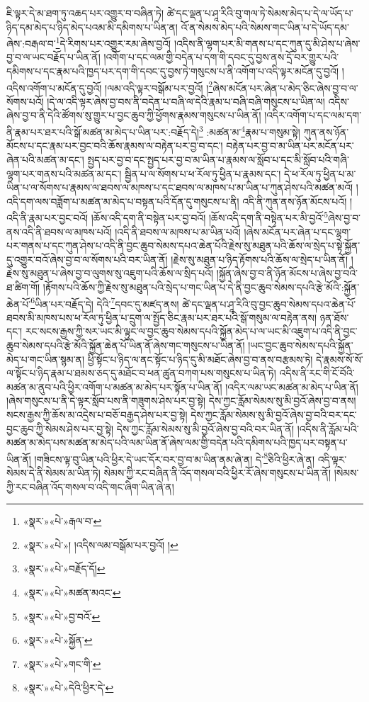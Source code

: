 ཇི་ལྟར་དེ་མ་ཐག་ཏུ་འཆད་པར་འགྱུར་བ་བཞིན་ཏེ། ཚེ་དང་ལྡན་པ་ཤཱ་རིའི་བུ་གལ་ཏེ་སེམས་མེད་པ་དེ་ལ་ཡོད་པ་ཉིད་དམ་མེད་པ་ཉིད་མེད་པའམ་མི་དམིགས་པ་ཡིན་ན། འོ་ན་སེམས་མེད་པའི་སེམས་གང་ཡིན་པ་དེ་ཡོད་དམ་ཞེས་:བརྒལ་བ་\footnote{«སྣར་»«པེ་»རྒལ་བ་}དེ་རིགས་པར་འགྱུར་རམ་ཞེས་བྱའོ། །འདིས་ནི་ལྷག་པར་མི་གནས་པ་དང་ཀུན་དུ་མི་ཤེས་པ་ཞེས་བྱ་བ་ལ་ཡང་བརྗོད་པ་ཡིན་ནོ། །འགོག་པ་དང་ལམ་གྱི་བདེན་པ་དག་གི་དབང་དུ་བྱས་ནས་དྲོ་བར་གྱུར་པའི་དམིགས་པ་དང་རྣམ་པའི་ཁྱད་པར་དག་གི་དབང་དུ་བྱས་ཏེ་གསུངས་པ་ནི་འགོག་པ་འདི་ལྟར་མངོན་དུ་བྱའོ། །འདིས་འགོག་པ་མངོན་དུ་བྱའོ། །ལམ་འདི་ལྟར་བསྒོམ་པར་བྱའོ། །\footnote{«སྣར་»«པེ་»། །འདིས་ལམ་བསྒོམ་པར་བྱའོ། །}ཞེས་མངོན་པར་ཞེན་པ་མེད་ཅིང་ཞེས་བྱ་བ་ལ་སོགས་པའོ། །དེ་ལ་འདི་ལྟར་ཞེས་བྱ་བས་ནི་བདེན་པ་བཞི་ལ་དེའི་རྣམ་པ་བཞི་བཞི་གསུངས་པ་ཡིན་ལ། འདིས་ཞེས་བྱ་བ་ནི་དེའི་ཚོགས་སུ་གྱུར་པ་བྱང་ཆུབ་ཀྱི་ཕྱོགས་རྣམས་གསུངས་པ་ཡིན་ནོ། །འདིར་འགོག་པ་དང་ལམ་དག་ནི་རྣམ་པར་ཐར་པའི་སྒོ་མཚན་མ་མེད་པ་ཡིན་པར་:བརྗོད་དེ།\footnote{«སྣར་»«པེ་»བརྗོད་དོ།} :མཚན་མ་\footnote{«སྣར་»«པེ་»མཚན་མའང་}རྣམ་པ་གསུམ་སྟེ། ཀུན་ནས་ཉོན་མོངས་པ་དང་རྣམ་པར་བྱང་བའི་ཆོས་རྣམས་ལ་བརྟེན་པར་བྱ་བ་དང་། བརྟེན་པར་བྱ་བ་མ་ཡིན་པར་མངོན་པར་ཞེན་པའི་མཚན་མ་དང་། སྤྱད་པར་བྱ་བ་དང་སྤྱད་པར་བྱ་བ་མ་ཡིན་པ་རྣམས་ལ་སློབ་པ་དང་མི་སློབ་པའི་གཞི་ལྷག་པར་གནས་པའི་མཚན་མ་དང་། སྦྱིན་པ་ལ་སོགས་པ་ཕ་རོལ་ཏུ་ཕྱིན་པ་རྣམས་དང་། དེ་ཕ་རོལ་ཏུ་ཕྱིན་པ་མ་ཡིན་པ་ལ་སོགས་པ་རྣམས་ལ་ཐབས་ལ་མཁས་པ་དང་ཐབས་ལ་མཁས་པ་མ་ཡིན་པ་ཀུན་ཤེས་པའི་མཚན་མའོ། །འདི་དག་ལས་བཟློག་པ་མཚན་མ་མེད་པ་བསྟན་པའི་དོན་དུ་གསུངས་པ་ནི། འདི་ནི་ཀུན་ནས་ཉོན་མོངས་པའོ། །འདི་ནི་རྣམ་པར་བྱང་བའོ། །ཆོས་འདི་དག་ནི་བསྟེན་པར་བྱ་བའོ། །ཆོས་འདི་དག་ནི་བསྟེན་པར་མི་བྱའོ་\footnote{«སྣར་»«པེ་»བྱ་བའོ་}ཞེས་བྱ་བ་ནས་འདི་ནི་ཐབས་ལ་མཁས་པའོ། །འདི་ནི་ཐབས་ལ་མཁས་པ་མ་ཡིན་པའོ། །ཞེས་མངོན་པར་ཞེན་པ་དང་ལྷག་པར་གནས་པ་དང་ཀུན་ཤེས་པ་འདི་ནི་བྱང་ཆུབ་སེམས་དཔའ་ཆེན་པོའི་རྗེས་སུ་མཐུན་པའི་ཆོས་ལ་སྲེད་པ་སྟེ་སྐྱོན་དུ་འགྱུར་བའོ་ཞེས་བྱ་བ་ལ་སོགས་པའི་བར་ཡིན་ནོ། །རྗེས་སུ་མཐུན་པ་ཉིད་རྟོགས་པའི་ཆོས་ལ་སྲེད་པ་ཡིན་ནོ། །རྗེས་སུ་མཐུན་པ་ཞེས་བྱ་བ་ལུགས་སུ་འཇུག་པའི་ཆོས་ལ་སྲིད་པའོ། །སྐྱོན་ཞེས་བྱ་བ་ནི་ཉོན་མོངས་པ་ཞེས་བྱ་བའི་ཐ་ཚིག་གོ། །རྟོགས་པའི་ཆོས་ཀྱི་རྗེས་སུ་མཐུན་པའི་སྲེད་པ་གང་ཡིན་པ་དེ་ནི་བྱང་ཆུབ་སེམས་དཔའི་རྩེ་མོའི་:སྐྱོན་ཆེན་པོ་\footnote{«སྣར་»«པེ་»སྐྱོན་}ཡིན་པར་བརྗོད་དེ། དེའི་\footnote{«སྣར་»«པེ་»གང་གི་}དབང་དུ་མཛད་ནས། ཚེ་དང་ལྡན་པ་ཤཱ་རིའི་བུ་བྱང་ཆུབ་སེམས་དཔའ་ཆེན་པོ་ཐབས་མི་མཁས་པས་ཕ་རོལ་ཏུ་ཕྱིན་པ་དྲུག་ལ་སྤྱོད་ཅིང་རྣམ་པར་ཐར་པའི་སྒོ་གསུམ་ལ་བརྟེན་ནས། ཉན་ཐོས་དང་། རང་སངས་རྒྱས་ཀྱི་སར་ཡང་མི་ལྟུང་ལ་བྱང་ཆུབ་སེམས་དཔའི་སྐྱོན་མེད་པ་ལ་ཡང་མི་འཇུག་པ་འདི་ནི་བྱང་ཆུབ་སེམས་དཔའི་རྩེ་མོའི་སྐྱོན་ཆེན་པོ་ཡིན་ནོ་ཞེས་གང་གསུངས་པ་ཡིན་ནོ། །ཡང་བྱང་ཆུབ་སེམས་དཔའི་སྐྱོན་མེད་པ་གང་ཡིན་སྙམ་ན། ཕྱི་སྟོང་པ་ཉིད་ལ་ནང་སྟོང་པ་ཉིད་དུ་མི་མཐོང་ཞེས་བྱ་བ་ནས་བརྩམས་ཏེ། དེ་རྣམས་སོ་སོ་ལ་སྟོང་པ་ཉིད་རྣམ་པ་ཐམས་ཅད་དུ་མཐོང་བ་ཕན་ཚུན་བཀག་པས་གསུངས་པ་ཡིན་ཏེ། འདིས་ནི་རང་གི་ངོ་བོའི་མཚན་མ་ནུབ་པའི་ཕྱིར་འགོག་པ་མཚན་མ་མེད་པར་སྟོན་པ་ཡིན་ནོ། །འདིར་ལམ་ཡང་མཚན་མ་མེད་པ་ཡིན་ནོ། །ཞེས་གསུངས་པ་ནི་དེ་ལྟར་སློབ་པས་ནི་གཟུགས་ཤེས་པར་བྱ་སྟེ། དེས་ཀྱང་རློམ་སེམས་སུ་མི་བྱའོ་ཞེས་བྱ་བ་ནས། སངས་རྒྱས་ཀྱི་ཆོས་མ་འདྲེས་པ་བཅོ་བརྒྱད་ཤེས་པར་བྱ་སྟེ། དེས་ཀྱང་རློམ་སེམས་སུ་མི་བྱའོ་ཞེས་བྱ་བའི་བར་དང་བྱང་ཆུབ་ཀྱི་སེམས་ཤེས་པར་བྱ་སྟེ། དེས་ཀྱང་རློམ་སེམས་སུ་མི་བྱའོ་ཞེས་བྱ་བའི་བར་ཡིན་ནོ། །འདིས་ནི་རློམ་པའི་མཚན་མ་མེད་པས་མཚན་མ་མེད་པའི་ལམ་ཡིན་ནོ་ཞེས་ལམ་གྱི་བདེན་པའི་དམིགས་པའི་ཁྱད་པར་བསྟན་པ་ཡིན་ནོ། །གཟིངས་ལྟ་བུ་ཡིན་པའི་ཕྱིར་དེ་ཡང་དོར་བར་བྱ་བ་མ་ཡིན་ནམ་ཞེ་ན། དེ་\footnote{«སྣར་»«པེ་»དེའི་ཕྱིར་དེ་}ཅིའི་ཕྱིར་ཞེ་ན། འདི་ལྟར་སེམས་དེ་ནི་སེམས་མ་ཡིན་ཏེ། སེམས་ཀྱི་རང་བཞིན་ནི་འོད་གསལ་བའི་ཕྱིར་རོ་ཞེས་གསུངས་པ་ཡིན་ནོ། །སེམས་ཀྱི་རང་བཞིན་འོད་གསལ་བ་འདི་གང་ཞིག་ཡིན་ཞེ་ན། 